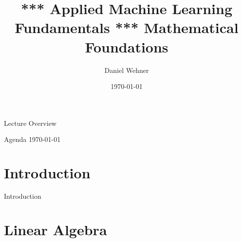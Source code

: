 
\usepackage{hyperref}
\usepackage{movie15}


\title[Mathematical Foundations]{*** Applied Machine Learning Fundamentals *** Mathematical Foundations}
\author{Daniel Wehner}
\date{\today}




\maketitlepage


\begin{frame}{Lecture Overview}{}
\end{frame}


\begin{frame}{Agenda \today}
	\begin{multicols}{2}
		\tableofcontents
	\end{multicols}
\end{frame}


\section{Introduction}

\begin{frame}{Introduction}{}

\end{frame}


\section{Linear Algebra}

